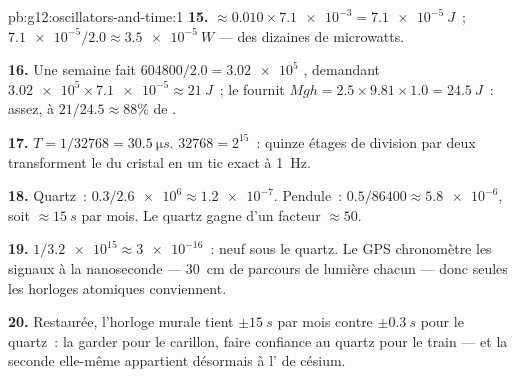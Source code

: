 \begin{solution}{pb:g12:oscillators-and-time:1}
\textbf{15.}  $\approx 0.010 \times \num{7.1e-3} =
\qty{7.1e-5}{J}$~;  $\num{7.1e-5}/2.0 \approx
\qty{3.5e-5}{W}$ --- des dizaines de microwatts.

\textbf{16.} Une semaine fait $604800/2.0 = \num{3.02e5}$
, demandant $\num{3.02e5} \times \num{7.1e-5}
\approx \qty{21}{J}$~; le  fournit $Mgh = 2.5
\times 9.81 \times 1.0 = \qty{24.5}{J}$~: assez, à $21/24.5 \approx
88\%$ de .

\textbf{17.} $T = 1/\num{32768} = \qty{30.5}{\micro s}$. $\num{32768}
= 2^{15}$~: quinze étages de division par deux transforment le
 du cristal en un tic exact à \qty{1}{Hz}.

\textbf{18.} Quartz~: $0.3/\num{2.6e6} \approx \num{1.2e-7}$.
Pendule~: $0.5/86400 \approx \num{5.8e-6}$, soit $\approx
\qty{15}{s}$ par mois. Le quartz gagne d'un facteur $\approx 50$.

\textbf{19.} $1/\num{3.2e15} \approx \num{3e-16}$~: neuf  sous le quartz. Le GPS chronomètre les signaux à la
nanoseconde --- \qty{30}{cm} de parcours de lumière chacun --- donc
seules les horloges atomiques conviennent.

\textbf{20.} Restaurée, l'horloge murale tient $\pm\qty{15}{s}$ par
mois contre $\pm\qty{0.3}{s}$ pour le quartz~: la garder pour le
carillon, faire confiance au quartz pour le train --- et la seconde
elle-même appartient désormais à l' de césium.
\end{solution}
